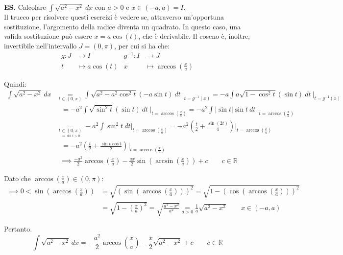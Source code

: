 \documentclass{article}
\begin{document}
\noindent\textbf{ES.} Calcolare $\int \sqrt{a^2 - x^2} \ dx$ con $a > 0$ e $x \in (-a, a) = I$.\\
Il trucco per risolvere questi esercizi è vedere se, attraverso un'opportuna sostituzione, l'argomento della radice diventa un quadrato. In questo caso, una valida sostituzione può essere $x = a\cos(t)$, che è derivabile. Il coseno è, inoltre, invertibile nell'intervallo $J = (0, \pi)$, per cui si ha che:
\begin{align*}
    g: J & \xrightarrow{} I & g^{-1}: I & \xrightarrow{} J \\
    t & \mapsto a\cos(t) & x & \mapsto \arccos\left(\frac{x}{a}\right)
\end{align*}

\noindent Quindi:
\begin{align*}
    \int \sqrt{a^2 - x^2} \ dx &\underset{t \in (0, \pi)}{=} \int \sqrt{a^2 - a^2\cos^2t}(-a\sin t) \ dt \ \bigg|_{t = g^{-1}(x)} = -a \int a\sqrt{1 - \cos^2t} (\sin t) \ dt \ \bigg|_{t = g^{-1}(x)}\\
    & \ \ \ = -a^2 \int \sqrt{\sin^2t}(\sin t) \ dt \ \bigg|_{t = \arccos(\frac{x}{a})} = -a^2 \int |\sin t| \sin t \ dt \ \bigg|_{t = \arccos(\frac{x}{a})} \\
    & \underset{\underset{\scriptstyle \Rightarrow  \sin t > 0}{t \in (0, \pi)}}{=} -a^2 \int \sin^2t \ dt \bigg|_{t = \arccos(\frac{x}{a})} = -a^2 \left(\frac{t}{2} + \frac{\sin(2t)}{4}\right) \bigg|_{t = \arccos(\frac{x}{a})} \\
    & \ \ \ = -a^2\left(\frac{t}{2} + \frac{\sin t\cos t}{2}\right) \bigg|_{t = \arccos(\frac{x}{a})} \\
    & \ \ \implies \frac{-a^2}{2}\arccos\left(\frac{x}{a}\right) - \frac{ax}{2} \sin\left(\arcsin\left(\frac{x}{a}\right)\right) + c \qquad c \in \mathbb{R}
\end{align*}

\noindent Dato che $\arccos(\frac{x}{a}) \in (0, \pi)$:
\begin{align*}
    \implies 0 < \sin\left(\arccos\left(\frac{x}{a}\right)\right) &= \sqrt{\left(\sin\left(\arccos\left(\frac{x}{a}\right)\right)\right)^2} = \sqrt{1 - \left(\cos\left(\arccos\left(\frac{x}{a}\right)\right)\right)^2} \\
    &= \sqrt{1 - \left(\frac{x}{a}\right)^2} = \sqrt{\frac{a^2 - x^2}{a^2}} \underset{a > 0}{=} \frac{1}{a} \sqrt{a^2 - x^2} \qquad x \in (-a, a)
\end{align*}

\noindent Pertanto.
\begin{equation*}
    \int \sqrt{a^2 - x^2} \ dx = -\frac{a^2}{2}\arccos\left(\frac{x}{a}\right) - \frac{x}{2}\sqrt{a^2 - x^2} + c \qquad c \in \mathbb{R}
\end{equation*}
\end{document}
